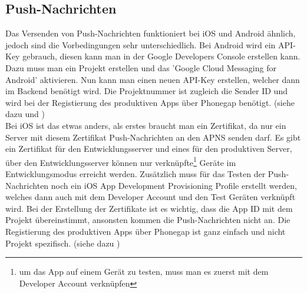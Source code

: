 \subsection{Push-Nachrichten}
Das Versenden von Push-Nachrichten funktioniert bei iOS und Android ähnlich, jedoch sind die Vorbedingungen sehr unterschiedlich. Bei Android wird ein API-Key gebrauch, diesen kann man in der Google Developers Console erstellen kann. Dazu muss man ein Projekt erstellen und das 'Google Cloud Messaging for Android' aktivieren. Nun kann man einen neuen API-Key erstellen, welcher dann im Backend benötigt wird. Die Projektnummer ist zugleich die Sender ID und wird bei der Registierung des produktiven Apps über Phonegap benötigt. (siehe dazu \cite{android_push_android} und \cite{devgirl_push_android})\\


Bei iOS ist das etwas anders, als erstes braucht man ein Zertifikat, da nur ein Server mit diesem Zertifikat Push-Nachrichten an den APNS senden darf. Es gibt ein Zertifikat für den Entwicklungsserver und eines für den produktiven Server, über den Entwicklungsserver können nur verknüpfte\footnote{um das App auf einem Gerät zu testen, muss man es zuerst mit dem Developer Account verknüpfen} Geräte im Entwicklungsmodus erreicht werden. Zusätzlich muss für das Testen der Push-Nachrichten noch ein iOS App Development Provisioning Profile erstellt werden, welches dann auch mit dem Developer Account und den Test Geräten verknüpft wird. Bei der Erstellung der Zertifikate ist es wichtig, dass die App ID mit dem Projekt übereinstimmt, ansonsten kommen die Push-Nachrichten nicht an. Die Registierung des produktiven Apps über Phonegap ist ganz einfach und nicht Projekt spezifisch. (siehe dazu \cite{ios_push})\\

